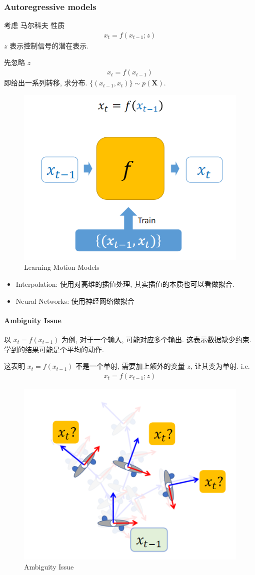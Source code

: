 \subsubsection{Autoregressive models}
考虑 马尔科夫 性质
\begin{align*}
    x_t = f(x_{t-1}; z)
\end{align*}
$z$ 表示控制信号的潜在表示.

先忽略 $z$
\begin{align*}
    x_t = f(x_{t-1})
\end{align*}
即给出一系列转移, 求分布. $\{ (x_{t-1}, x_t) \}\sim p(\bm X)$.

\begin{figure}[!htb]
    \centering
    \includegraphics[width=0.309\linewidth]{pic/1056/Learning Motion Models3.png}
    \caption{Learning Motion Models}
\end{figure}

\begin{itemize}
    \item Interpolation: 使用对高维的插值处理,  其实插值的本质也可以看做拟合. 
    \item Neural Networks: 使用神经网络做拟合
\end{itemize}

\paragraph{Ambiguity Issue}
以 $x_t = f(x_{t-1})$ 为例, 对于一个输入, 可能对应多个输出. 这表示数据缺少约束. 学到的结果可能是个平均的动作. 

这表明 $x_t = f(x_{t-1})$ 不是一个单射, 需要加上额外的变量 $z$, 让其变为单射. i.e.
\begin{align*}
    x_t = f(x_{t-1};z)
\end{align*}

\begin{figure}[!htb]
    \centering
    \includegraphics[width=0.309\linewidth]{pic/1056/Ambiguity Issue}
    \caption{Ambiguity Issue}
\end{figure}

